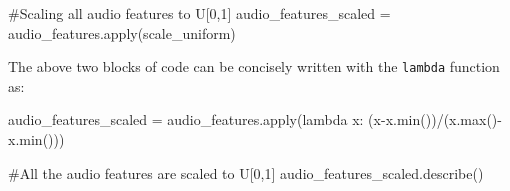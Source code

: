 \documentclass[
  letterpaper,
  DIV=11,
  numbers=noendperiod]{scrreprt}
\newenvironment{Shaded}{\begin{snugshade}}{\end{snugshade}}
\newcommand{\BuiltInTok}[1]{\textcolor[rgb]{0.00,0.23,0.31}{#1}}
\newcommand{\CommentTok}[1]{\textcolor[rgb]{0.37,0.37,0.37}{#1}}
\newcommand{\KeywordTok}[1]{\textcolor[rgb]{0.00,0.23,0.31}{#1}}
\newcommand{\NormalTok}[1]{\textcolor[rgb]{0.00,0.23,0.31}{#1}}
\newcommand{\OperatorTok}[1]{\textcolor[rgb]{0.37,0.37,0.37}{#1}}
\begin{document}
\begin{Shaded}
\begin{Highlighting}[]
\CommentTok{\#Scaling all audio features to U[0,1]}
\NormalTok{audio\_features\_scaled }\OperatorTok{=}\NormalTok{ audio\_features.}\BuiltInTok{apply}\NormalTok{(scale\_uniform)}
\end{Highlighting}
\end{Shaded}

The above two blocks of code can be concisely written with the
\texttt{lambda} function as:

\begin{Shaded}
\begin{Highlighting}[]
\NormalTok{audio\_features\_scaled }\OperatorTok{=}\NormalTok{ audio\_features.}\BuiltInTok{apply}\NormalTok{(}\KeywordTok{lambda}\NormalTok{ x: (x}\OperatorTok{{-}}\NormalTok{x.}\BuiltInTok{min}\NormalTok{())}\OperatorTok{/}\NormalTok{(x.}\BuiltInTok{max}\NormalTok{()}\OperatorTok{{-}}\NormalTok{x.}\BuiltInTok{min}\NormalTok{()))}
\end{Highlighting}
\end{Shaded}

\begin{Shaded}
\begin{Highlighting}[]
\CommentTok{\#All the audio features are scaled to U[0,1]}
\NormalTok{audio\_features\_scaled.describe()}
\end{Highlighting}
\end{Shaded}
\end{document}

